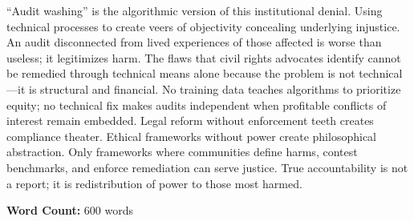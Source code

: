 \documentclass[12pt,twoside]{article}
\begin{document}
``Audit washing'' is the algorithmic version of this institutional denial. Using technical processes to create veers of objectivity concealing underlying injustice. An audit disconnected from lived experiences of those affected is worse than useless; it legitimizes harm. The flaws that civil rights advocates identify cannot be remedied through technical means alone because the problem is not technical—it is structural and financial. No training data teaches algorithms to prioritize equity; no technical fix makes audits independent when profitable conflicts of interest remain embedded. Legal reform without enforcement teeth creates compliance theater. Ethical frameworks without power create philosophical abstraction. Only frameworks where communities define harms, contest benchmarks, and enforce remediation can serve justice. True accountability is not a report; it is redistribution of power to those most harmed.

\vfill
\noindent\centering\footnotesize\textbf{Word Count:} 600 words
\end{document}
